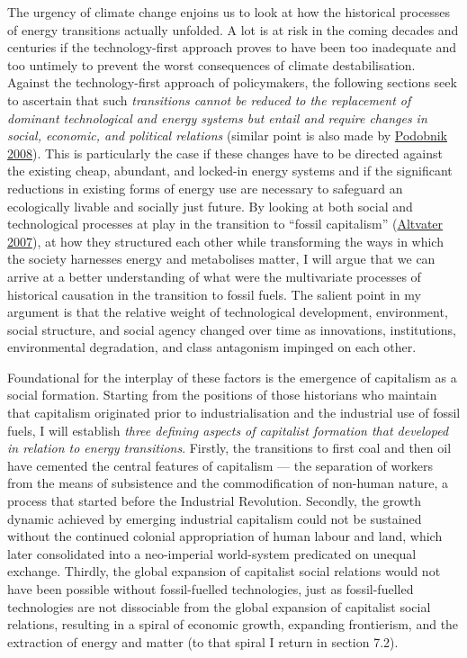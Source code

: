 \documentclass[a4paper, nobind]{templates/ociamthesis}
\begin{document}
The urgency of climate change enjoins us to look at how the historical processes of energy transitions actually unfolded. A lot is at risk in the coming decades and centuries if the technology-first approach proves to have been too inadequate and too untimely to prevent the worst consequences of climate destabilisation. Against the technology-first approach of policymakers, the following sections seek to ascertain that such \emph{transitions cannot be reduced to the replacement of dominant technological and energy systems but entail and require changes in social, economic, and political relations} (similar point is also made by \protect\hyperlink{ref-podobnik_global_2008}{Podobnik 2008}). This is particularly the case if these changes have to be directed against the existing cheap, abundant, and locked-in energy systems and if the significant reductions in existing forms of energy use are necessary to safeguard an ecologically livable and socially just future. By looking at both social and technological processes at play in the transition to ``fossil capitalism'' (\protect\hyperlink{ref-altvater_social_2007}{Altvater 2007}), at how they structured each other while transforming the ways in which the society harnesses energy and metabolises matter, I will argue that we can arrive at a better understanding of what were the multivariate processes of historical causation in the transition to fossil fuels. The salient point in my argument is that the relative weight of technological development, environment, social structure, and social agency changed over time as innovations, institutions, environmental degradation, and class antagonism impinged on each other.

Foundational for the interplay of these factors is the emergence of capitalism as a social formation. Starting from the positions of those historians who maintain that capitalism originated prior to industrialisation and the industrial use of fossil fuels, I will establish \emph{three defining aspects of capitalist formation that developed in relation to energy transitions}. Firstly, the transitions to first coal and then oil have cemented the central features of capitalism --- the separation of workers from the means of subsistence and the commodification of non-human nature, a process that started before the Industrial Revolution. Secondly, the growth dynamic achieved by emerging industrial capitalism could not be sustained without the continued colonial appropriation of human labour and land, which later consolidated into a neo-imperial world-system predicated on unequal exchange. Thirdly, the global expansion of capitalist social relations would not have been possible without fossil-fuelled technologies, just as fossil-fuelled technologies are not dissociable from the global expansion of capitalist social relations, resulting in a spiral of economic growth, expanding frontierism, and the extraction of energy and matter (to that spiral I return in section 7.2).
\end{document}
